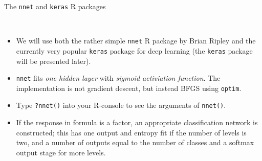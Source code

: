 \documentclass[10pt,ignorenonframetext,]{beamer}
\begin{document}
\begin{frame}[fragile]

\begin{block}{The \texttt{nnet} and \texttt{keras} R packages}

\(~\)

\begin{itemize}
\item
  We will use both the rather simple \texttt{nnet} R package by Brian
  Ripley and the currently very popular \texttt{keras} package for deep
  learning (the \texttt{keras} package will be presented later).
  \vspace{2mm}
\item
  \texttt{nnet} fits \emph{one hidden layer} with \emph{sigmoid
  activiation function}. The implementation is not gradient descent, but
  instead BFGS using \texttt{optim}. \vspace{2mm}
\end{itemize}

\begin{itemize}
\item
  Type \texttt{?nnet()} into your R-console to see the arguments of
  \texttt{nnet()}. \vspace{2mm}
\item
  If the response in formula is a factor, an appropriate classification
  network is constructed; this has one output and entropy fit if the
  number of levels is two, and a number of outputs equal to the number
  of classes and a softmax output stage for more levels.
\end{itemize}

\end{block}

\end{frame}
\end{document}
